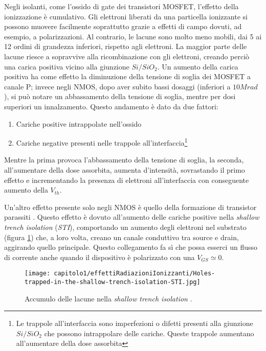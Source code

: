 Negli isolanti, come l'ossido di gate dei transistori MOSFET, l'effetto della ionizzazione è cumulativo. Gli elettroni liberati da una particella ionizzante si possono muovere facilmente soprattutto grazie a effetti di campo dovuti, ad esempio, a polarizzazioni.
Al contrario, le lacune sono molto meno mobili, dai 5 ai 12 ordini di grandezza inferiori, rispetto agli elettroni. La maggior parte delle lacune riesce a sopravvive alla ricombinazione con gli elettroni, creando perciò una carica positiva vicino alla giunzione $Si/SiO_2$. Un aumento della carica positiva ha come effetto la diminuzione della tensione di soglia dei MOSFET a canale P; invece negli NMOS, dopo aver subito bassi dosaggi (inferiori a $10Mrad$), si può notare un abbassamento della tensione di soglia, mentre per dosi superiori un innalzamento. Questo andamento è dato da due fattori:
\begin{enumerate}
	\item Cariche positive intrappolate nell'ossido
	\item Cariche negative presenti nelle trappole all'interfaccia\footnote{Le trappole all'interfaccia sono imperfezioni o difetti presenti alla giunzione $Si/SiO_2$ che possono intrappolare delle cariche. Queste trappole aumentano all'aumentare della dose assorbita}
\end{enumerate}
Mentre la prima provoca l'abbassamento della tensione di soglia, la seconda, all'aumentare della dose assorbita, aumenta d'intensità, sovrastando il primo effetto e incrementando la presenza di elettroni all'interfaccia con conseguente aumento della $V_{th}$.  

\vspace{0.5cm}

Un'altro effetto presente solo negli NMOS è quello della formazione di transistor parassiti \cite{effetti_radiazioni:CMOS_IC_radiation_hardening_by_design}. Questo effetto è dovuto all'aumento delle cariche positive nella \textit{shallow trench isolation} (\textit{STI}), comportando un aumento degli elettroni nel substrato (figura \ref{fig:accumulo_lacune_STI}) che, a loro volta, creano un canale conduttivo tra source e drain, aggirando quello principale. Questo collegamento fa sì che possa esserci un flusso di corrente anche quando il dispositivo è polarizzato con una $V_{GS} \simeq 0$.

\begin{figure}[ht]
	\centering

	\texttt{[image: capitolo1/effettiRadiazioniIonizzanti/Holes-trapped-in-the-shallow-trench-isolation-STI.jpg]}

	\caption[Lacune nella \textit{STI}]{Accumulo delle lacune nella \textit{shallow trench isolation} \cite{effetti_radiazioni:CMOS_IC_radiation_hardening_by_design}.}
	\label{fig:accumulo_lacune_STI}

\end{figure}


